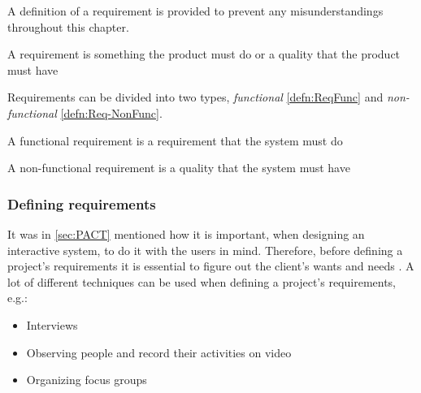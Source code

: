 A definition of a requirement is provided to prevent any misunderstandings throughout this chapter.

\begin{defn}\label{defn:Req}
    A requirement is something the product must do or a quality that the product must have
\end{defn}

Requirements can be divided into two types, \textit{functional} \cref{defn:ReqFunc} and \textit{non-functional} \cref{defn:Req-NonFunc}.

\begin{defn}\label{defn:ReqFunc}
    A functional requirement is a requirement that the system must do
\end{defn}

\begin{defn}\label{defn:Req-NonFunc}
    A non-functional requirement is a quality that the system must have
\end{defn}

\subsubsection{Defining requirements} \label{sec:requirementsdefinition}
It was in \cref{sec:PACT} mentioned how it is important, when designing an interactive system, to do it with the users in mind.
Therefore, before defining a project's requirements it is essential to figure out the client's wants and needs%
.
A lot of different techniques can be used when defining a project's requirements, e.g.:

\begin{itemize}
    \item Interviews
    \item Observing people and record their activities on video
    \item Organizing focus groups
\end{itemize}


